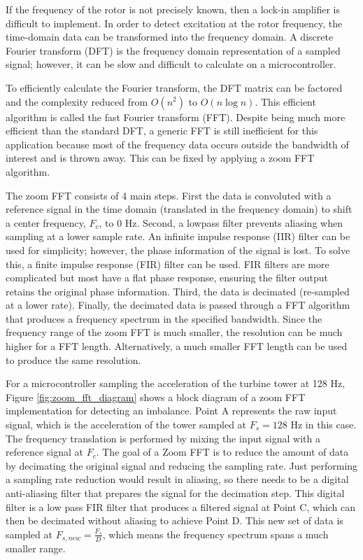 If the frequency of the rotor is not precisely known, then a lock-in amplifier is difficult to implement.  In order to detect excitation at the rotor frequency, the time-domain data can be transformed into the frequency domain.  A discrete Fourier transform (DFT) is the frequency domain representation of a sampled signal; however, it can be slow and difficult to calculate on a microcontroller.

To efficiently calculate the Fourier transform, the DFT matrix can be factored and the complexity reduced from $O(n^2)$ to $O(n \log{n})$.  This efficient algorithm is called the fast Fourier transform (FFT).  Despite being much more efficient than the standard DFT, a generic FFT is still inefficient for this application because most of the frequency data occurs outside the bandwidth of interest and is thrown away.  This can be fixed by applying a zoom FFT algorithm.

The zoom FFT consists of 4 main steps.  First the data is convoluted with a reference signal in the time domain (translated in the frequency domain) to shift a center frequency, $F_c$, to 0 Hz.  Second, a lowpass filter prevents aliasing when sampling at a lower sample rate.  An infinite impulse response (IIR) filter can be used for simplicity; however, the phase information of the signal is lost.  To solve this, a finite impulse response (FIR) filter can be used.  FIR filters are more complicated but most have a flat phase response, ensuring the filter output retains the original phase information.  Third, the data is decimated (re-sampled at a lower rate). Finally, the decimated data is passed through a FFT algorithm that produces a frequency spectrum in the specified bandwidth.  Since the frequency range of the zoom FFT is much smaller, the resolution can be much higher for a FFT length.  Alternatively, a much smaller FFT length can be used to produce the same resolution.

For a microcontroller sampling the acceleration of the turbine tower at 128 Hz, Figure \ref{fig:zoom_fft_diagram} shows a block diagram of a zoom FFT implementation for detecting an imbalance.  Point A represents the raw input signal, which is the acceleration of the tower sampled at $F_s=128$ Hz in this case.  The frequency translation is performed by mixing the input signal with a reference signal at $F_c$.  The goal of a Zoom FFT is to reduce the amount of data by decimating the original signal and reducing the sampling rate.  Just performing a sampling rate reduction would result in aliasing, so there needs to be a digital anti-aliasing filter that prepares the signal for the decimation step.  This digital filter is a low pass FIR filter that produces a filtered signal at Point C, which can then be decimated without aliasing to achieve Point D.  This new set of data is sampled at $F_{s,new}=\frac{F_s}{D}$, which means the frequency spectrum spans a much smaller range.

